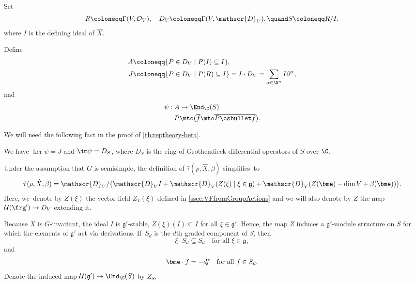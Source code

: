 Set
\[
R\coloneqq \Gamma(V, \mathcal{O}_V), \quad D_V \coloneqq \Gamma(V, \mathscr{D}_V),\quand S\coloneqq R/I,
\]
where $I$ is the defining ideal of $\hat{X}$.

Define
\begin{equation}\label{eq:subAlg}
\begin{aligned}
A &\coloneqq \{P\in D_V \mid P(I) \subseteq I\},\\
J &\coloneqq \{P\in D_V \mid P(R) \subseteq I\} = I\cdot D_V=\sum_{\alpha\in \N^n} I\partial^\alpha,\\
\end{aligned}
\end{equation}
and
\begin{equation}\label{eq:MapPsi}
\begin{aligned}
\psi:A&\to\End_\C(S) \\
P&\mto(\overline{f}\mto\overline{P\csbullet f}).
\end{aligned}
\end{equation}

We will need the following fact in the proof of \cref{th:reptheory-beta}.

\begin{lem}\label{milicic-ker}
We have $\ker\psi=J$ and $\im\psi=D_S$, where $D_S$ is the ring of Grothendieck differential operators of $S$ over $\C$.
\end{lem}

Under the assumption that $G$ is semisimple, the definition of $\hat\tau(\rho, \hat{X},\beta)$ simplifies~to
\[
\hat\tau(\rho, \hat{X}, \beta) = \mathscr{D}_V/\bigl(\mathscr{D}_VI + \mathscr{D}_V(Z(\xi) \mid \xi \in \mathfrak{g}) + \mathscr{D}_V(Z(\bme)-\dim V + \beta(\bme))\bigr).
\]
Here, we~denote by $Z(\xi)$ the vector field $Z_V(\xi)$ defined in \cref{ssec:VFfromGroupActions} and we will also denote by $Z$ the map $\mathcal U(\frg') \to D_V$ extending it.

Because $X$ is $G$-invariant, the ideal $I$ is $\mathfrak{g}'$-stable, \ie $Z(\xi)(I)\subseteq I$ for all $\xi\in \mathfrak{g}'$. Hence, the map $Z$ induces a $\mathfrak{g}'$\nobreakdash-mod\-ule structure on $S$ for which the elements of $\mathfrak{g}'$ act via derivations. If~$S_d$ is the $d$th graded component of $S$, then
\[
\xi\cdot S_d \subseteq S_d \quad \text{for all }\xi \in \mathfrak{g},
\]
and
\begin{equation}\label{eq:eul-scales}
\bme\cdot f = -df\quad\text{for all }f\in S_d.
\end{equation}
Denote the induced map $\mathcal{U}(\mathfrak{g}') \to \End_\C(S)$ by $Z_S$.


